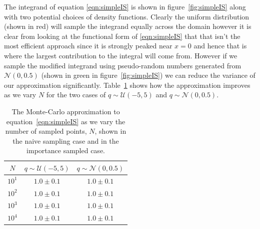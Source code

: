 	The integrand of equation \ref{eqn:simpleIS} is shown in figure~\ref{fig:simpleIS} along with two potential choices of density functions.
	Clearly the uniform distribution (shown in red) will sample the integrand equally across the domain however it is clear from looking
	at the functional form of \ref{eqn:simpleIS} that that isn't the most efficient approach since it is strongly peaked near $x=0$ and
	hence that is where the largest contribution to the integral will come from.  However if we sample the modified integrand using
	pseudo-random numbers generated from $\mathcal{N}(0, 0.5)$ (shown in green in figure~\ref{fig:simpleIS}) we can reduce the variance
	of our approximation significantly.  Table~\ref{tab:simpleIS} shows how the approximation improves as we vary $N$ for the two cases
	of $q\sim\mathcal{U}(-5,5)$ and $q\sim\mathcal{N}(0,0.5)$.

	\begin{table}[htp]
		\begin{center}
		\begin{tabular}{c | c | c}
		$N$       & $q\sim\mathcal{U}(-5,5)$ & $q\sim\mathcal{N}(0,0.5)$ \\ \hline
		$10^1$    & $1.0\pm0.1$              & $1.0\pm0.1$ \\
		$10^2$    & $1.0\pm0.1$              & $1.0\pm0.1$ \\
		$10^3$    & $1.0\pm0.1$              & $1.0\pm0.1$ \\
		$10^4$    & $1.0\pm0.1$              & $1.0\pm0.1$ \\
		\end{tabular}
		\caption{The Monte-Carlo approximation to equation~\ref{eqn:simpleIS} as we vary the number of sampled points, $N$, shown in
		the naive sampling case and in the importance sampled case.}
		\label{tab:simpleIS}
		\end{center}
	\end{table}

